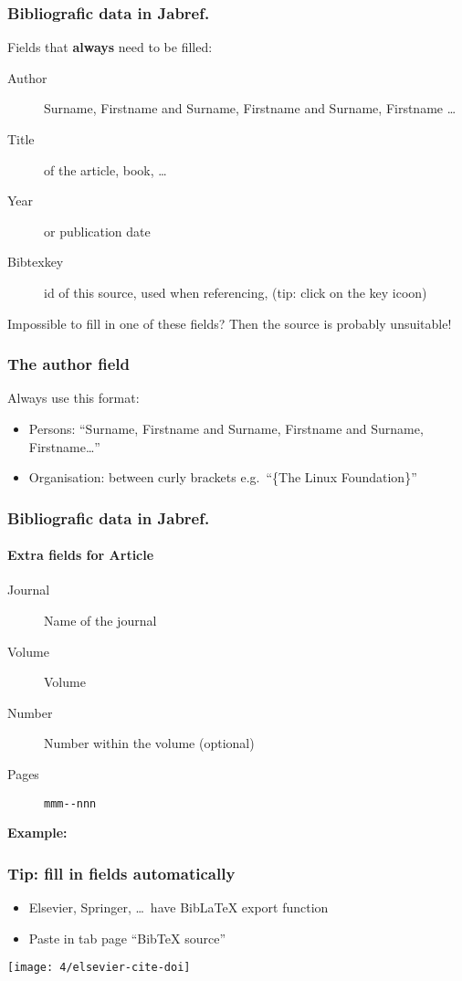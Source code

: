 \documentclass[aspectratio=169]{beamer}
\begin{document}
\begin{frame}
  \frametitle{Bibliografic data in Jabref.}

  Fields that \textbf{always} need to be filled:

  \begin{description}
    \item[Author] Surname, Firstname and Surname, Firstname and Surname, Firstname \ldots
    \item[Title] of the article, book, \ldots
    \item[Year] or publication date
    \item[Bibtexkey] id of this source, used when referencing, (tip: click on the key icoon)
  \end{description}
    \bigskip
Impossible to fill in one of these fields? Then the source is probably unsuitable!
\end{frame}

\begin{frame}
    \frametitle{The author field}
    
    Always use this format:
    
    \begin{itemize}
        \item Persons: ``Surname, Firstname and Surname, Firstname and Surname, Firstname\ldots''
        \item Organisation: between curly brackets e.g.\ ``\{The Linux Foundation\}''
    \end{itemize}
    
\end{frame}

\begin{frame}[fragile]
  \frametitle{Bibliografic data in Jabref.}
  \framesubtitle{Extra fields for Article}

  \begin{description}
    \item[Journal] Name of the journal
    \item[Volume] Volume
    \item[Number] Number within the volume (optional)
    \item[Pages] \verb|mmm--nnn|
  \end{description}

  \bigskip

  \textbf{Example:} 

\end{frame}

\begin{frame}
    \frametitle{Tip: fill in fields automatically}
    
    \begin{itemize}
        \item Elsevier, Springer, \ldots\ have Bib\LaTeX{} export function
        \item Paste in tab page ``BibTeX source''
    \end{itemize}
    
    \bigskip
    
    \centering
    \texttt{[image: 4/elsevier-cite-doi]}
    
\end{frame}
\end{document}
